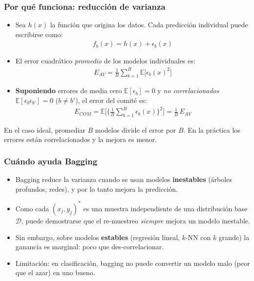 \documentclass[aspectratio=169, 10pt]{beamer}
\begin{document}
\begin{frame}
\frametitle{Por qu\'e funciona: reducci\'on de varianza}
\begin{itemize}
\item Sea $h(x)$ la funci\'on que origina los datos. Cada predicci\'on individual puede escribirse como:
\begin{align}
f_b(x)=h(x)+\epsilon_b(x)
\end{align}
\pause
\item El error cuadr\'atico \emph{promedio} de los modelos individuales es:
\begin{align}
E_{AV}=\frac{1}{B} \sum_{b=1}^B \mathbb{E}\big[\epsilon_b(x)^2\big]
\end{align}
\pause
\item \textbf{Suponiendo} errores de media cero $\mathbb{E}[\epsilon_b]=0$ y \emph{no correlacionados} $\mathbb{E}[\epsilon_b\epsilon_{b'}]=0$ ($b\neq b'$), el error del comit\'e es:
\begin{align}
E_{COM}=\mathbb{E}\Big[\big\{ \tfrac{1}{B} \textstyle\sum_{b=1}^B \epsilon_b(x) \big\}^2\Big]=\frac{1}{B}\, E_{AV}
\end{align}
\end{itemize}
\pause
\begin{block}{}
En el caso ideal, promediar $B$ modelos divide el error por $B$. En la pr\'actica los errores est\'an correlacionados y la mejora es menor.
\end{block}
\end{frame}

\begin{frame}
\frametitle{Cu\'ando ayuda Bagging}
\begin{itemize}
\item Bagging reduce la varianza cuando se usan modelos \textbf{inestables} (\'arboles profundos, redes), y por lo tanto mejora la predicci\'on.
\pause
\item Como cada $(x_j,y_j)^*$ es una muestra independiente de una distribuci\'on base $\mathcal{D}$, puede demostrarse que el re-muestreo \emph{siempre} mejora un modelo inestable.
\pause
\item Sin embargo, sobre modelos \textbf{estables} (regresi\'on lineal, $k$-NN con $k$ grande) la ganancia es marginal: poco que des-correlacionar.
\pause
\item Limitaci\'on: en clasificaci\'on, bagging no puede convertir un modelo malo (peor que el azar) en uno bueno.
\end{itemize}
\end{frame}
\end{document}
